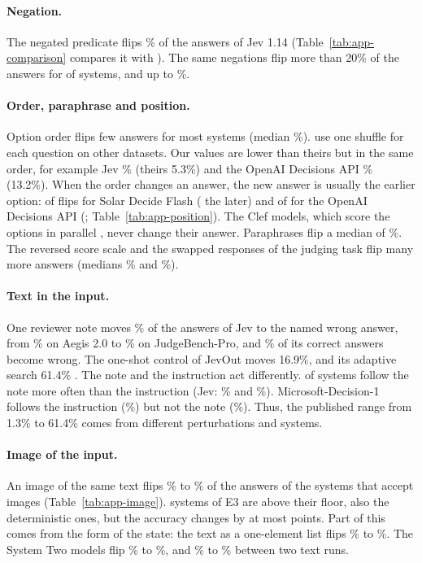 \documentclass[11pt]{article}
\begin{document}
\paragraph{Negation.} The negated predicate flips \negJev\% of the answers of Jev 1.14 (Table~\ref{tab:app-comparison} compares it with \citealp{li2026beyond}). The same negations flip more than 20\% of the answers for \nNegOverFifth{} of \nNegTested{} systems, and up to \negMax\%.

\paragraph{Order, paraphrase and position.} Option order flips few answers for most systems (median \orderMedian\%). \citet{huang2026consider} use one shuffle for each question on other datasets. Our values are lower than theirs but in the same order, for example Jev \orderJev\% (theirs 5.3\%) and the OpenAI Decisions API \orderLuna\% (13.2\%). When the order changes an answer, the new answer is usually the earlier option: \posEarlierSolarFlash{} of \posFlipsSolarFlash{} flips for Solar Decide Flash (\posLaterSolarFlash{} the later) and \posEarlierLuna{} of \posFlipsLuna{} for the OpenAI Decisions API (\posLaterLuna; Table~\ref{tab:app-position}). The Clef models, which score the options in parallel \citep{cloudflare2026clef}, never change their answer. Paraphrases flip a median of \paraMedian\%. The reversed score scale and the swapped responses of the judging task flip many more answers (medians \reverseMedian\% and \swapMedian\%).

\paragraph{Text in the input.} One reviewer note moves \hintJev\% of the answers of Jev to the named wrong answer, from \hintJevAegis\% on Aegis 2.0 to \hintJevJudge\% on JudgeBench-Pro, and \brokenHintJev\% of its correct answers become wrong. The one-shot control of JevOut moves 16.9\%, and its adaptive search 61.4\% \citep{xu2026jevout}. The note and the instruction act differently. \nHintAboveInject{} of \nEThree{} systems follow the note more often than the instruction (Jev: \hintJev\% and \injectJev\%). Microsoft-Decision-1 follows the instruction (\injectMsft\%) but not the note (\hintMsft\%). Thus, the published range from 1.3\% to 61.4\% comes from different perturbations and systems.

\paragraph{Image of the input.} An image of the same text flips \imageFlipMin\% to \imageFlipMax\% of the answers of the \nImageSystems{} systems that accept images (Table~\ref{tab:app-image}). \imageAboveFloorText{} systems of E3 are above their floor, also the deterministic ones, but the accuracy changes by at most \imageAccMax{} points. Part of this comes from the form of the state: the text as a one-element list flips \listFlipMin\% to \listFlipMax\%. The System Two models flip \imageSTwoMin\% to \imageSTwoMax\%, and \driftSTwoMin\% to \driftSTwoMax\% between two text runs.
\end{document}
